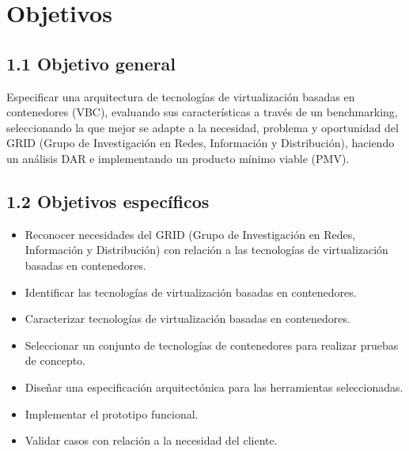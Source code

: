 \chapter*{Objetivos}
\label{cap:objetivos}

\section*{1.1 Objetivo general}
\label{cap:objetivoGeneral}

Especificar una arquitectura de tecnologías de virtualización basadas en contenedores (VBC), evaluando sus características a través de un benchmarking, seleccionando la que mejor se adapte a la necesidad, problema y oportunidad del GRID (Grupo de Investigación en Redes, Información y Distribución), haciendo un análisis DAR e implementando un producto mínimo viable (PMV).

\section*{1.2 Objetivos específicos}
\label{cap:objetivosEspecificos}
\begin{itemize}
    \item Reconocer necesidades del GRID (Grupo de Investigación en Redes, Información y Distribución) con relación a las tecnologías de virtualización basadas en contenedores.
    \item Identificar las tecnologías de virtualización basadas en contenedores.
    \item Caracterizar tecnologías de virtualización basadas en contenedores.
    \item Seleccionar un conjunto de tecnologías de contenedores para realizar pruebas de concepto.
    \item Diseñar una especificación arquitectónica para las herramientas seleccionadas.
    \item Implementar el prototipo funcional.
    \item Validar casos con relación a la necesidad del cliente.
\end{itemize}